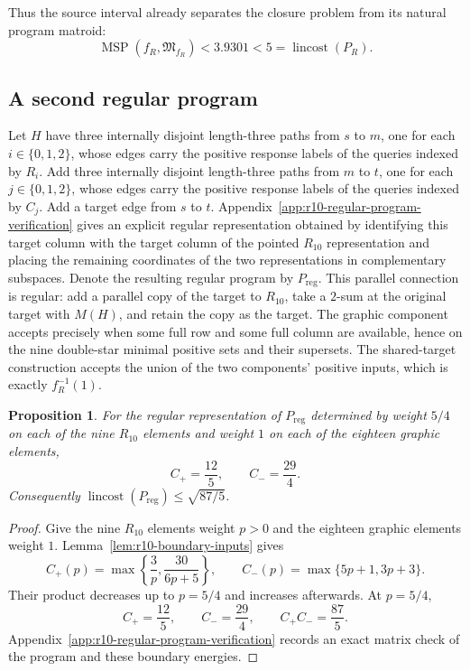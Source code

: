 \documentclass[11pt]{article}
\numberwithin{equation}{section}
\newtheorem{proposition}[definition]{Proposition}
\theoremstyle{remark}
\begin{document}
Thus the source interval already separates the closure problem from its
natural program matroid:
\begin{equation}
    \operatorname{MSP}(f_R,\mathfrak M_{f_R})<3.9301<5
    =\operatorname{lincost}(P_R).
\end{equation}

\subsection{A second regular program}

Let $H$ have three internally disjoint length-three paths from $s$ to $m$,
one for each $i\in\{0,1,2\}$, whose edges carry the positive response
labels of the queries indexed by $R_i$. Add three internally disjoint
length-three paths from $m$ to $t$, one for each $j\in\{0,1,2\}$, whose
edges carry the positive response labels of the queries indexed by $C_j$.
Add a target edge from $s$ to $t$. Appendix~\ref{app:r10-regular-program-verification}
gives an explicit regular representation obtained by identifying this target
column with the target column of the pointed $R_{10}$ representation and
placing the remaining coordinates of the two representations in complementary
subspaces. Denote the resulting regular program by $P_{\mathrm{reg}}$.
This parallel connection is regular: add a parallel copy of the target to
$R_{10}$, take a $2$-sum at the original target with $M(H)$, and retain the
copy as the target. The graphic component accepts precisely when some full
row and some full column are available, hence on the nine double-star
minimal positive sets and their supersets. The shared-target construction
accepts the union of the two components' positive inputs, which is exactly
$f_R^{-1}(1)$.

\begin{proposition}
\label{prop:r10-regular-route-b}
For the regular representation of $P_{\mathrm{reg}}$ determined by weight
$5/4$ on each of the nine $R_{10}$ elements and weight $1$ on each of the
eighteen graphic elements,
\begin{equation}
    C_+=\frac{12}{5},
    \qquad
    C_-=\frac{29}{4}.
\end{equation}
Consequently
$\operatorname{lincost}(P_{\mathrm{reg}})\leq\sqrt{87/5}$.
\end{proposition}

\begin{proof}
Give the nine $R_{10}$ elements weight $p>0$ and the eighteen graphic
elements weight $1$. Lemma~\ref{lem:r10-boundary-inputs} gives
\begin{equation}
    C_+(p)=\max\left\{\frac3p,\frac{30}{6p+5}\right\},
    \qquad
    C_-(p)=\max\{5p+1,3p+3\}.
\end{equation}
Their product decreases up to $p=5/4$ and increases afterwards. At
$p=5/4$,
\begin{equation}
    C_+=\frac{12}{5},
    \qquad
    C_-=\frac{29}{4},
    \qquad
    C_+C_-=\frac{87}{5}.
\end{equation}
Appendix~\ref{app:r10-regular-program-verification} records an exact matrix
check of the program and these boundary energies.
\end{proof}
\end{document}
